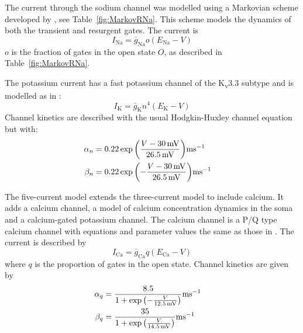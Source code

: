 \documentclass[twocolumn]{svjour3}          %
\newcommand{\mv}{\,\mathrm{mV}}
\renewcommand{\k}{\mathrm{K}}
\newcommand{\ca}{\mathrm{Ca}}
\newcommand{\na}{\mathrm{Na}}
\begin{document}
The current through the sodium channel was modelled using a Markovian
scheme developed by \citet{RamanBean2001}, see
Table~\ref{fig:MarkovRNa}. This scheme models the dynamics of both the
transient and resurgent gates. The current is
\begin{equation}
\label{eq:I_RNa}
I_{\na} = \bar{g}_\na o (E_\na-V)
\end{equation}
$o$ is the fraction of gates in the open state $O$, as described in Table~\ref{fig:MarkovRNa}.

The potassium current has a fast potassium channel of the K\textsubscript{v}3.3 subtype and is modelled as in
\citet{MasoliEtAl2015}:
\begin{equation}
\label{eq:I_K}
I_{\k} = \bar{g}_{\k} n^4(E_{\k}-V)
\end{equation}
Channel kinetics are described with the usual Hodgkin-Huxley channel equation but with:
\begin{align}
\label{eq:n_kinetics}
\alpha_{n} &= 0.22
\exp{\left(\frac{V-30\mv}{26.5\mv}\right)}\mathrm{ms}^{-1}\cr 
\beta_{n} &= 0.22
\exp{\left(-\frac{V-30\mv}{26.5\mv}\right)}\mathrm{ms}^{-1}
\end{align}

The five-current model extends the three-current model to include
calcium. It adds a calcium channel, a model of calcium concentration
dynamics in the soma and a calcium-gated potassium channel. The
calcium channel is a P/Q type calcium channel with equations and
parameter values the same as those in \citet{MiyashoEtAl2001}. The
current is described by
\begin{equation}
\label{eq:I_Ca}
I_\ca =\bar{g}_{\ca} q(E_\ca-V)
\end{equation}
where $q$ is the proportion of gates in the open state. Channel kinetics are given by
\begin{align}
\label{eq:q_kinetics}
\alpha_{q} &= \frac{8.5}{ 1 +
  \exp{\left(-\frac{V}{12.5\mv}\right)}}\mathrm{ms}^{-1}\cr \beta_{q} &=
\frac{35}{ 1 + \exp{\left(\frac{V}{14.5\mv}\right)}}\mathrm{ms}^{-1}
\end{align}
\end{document}
